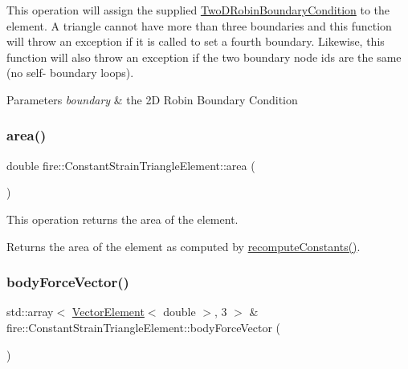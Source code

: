 This operation will assign the supplied \hyperlink{a00805}{Two\+D\+Robin\+Boundary\+Condition} to the element. A triangle cannot have more than three boundaries and this function will throw an exception if it is called to set a fourth boundary. Likewise, this function will also throw an exception if the two boundary node ids are the same (no self-\/ boundary loops). 
\begin{DoxyParams}{Parameters}
{\em boundary} & the 2D Robin Boundary Condition \\
\hline
\end{DoxyParams}
\mbox{\label{a00789_acd197716c6bffaa3c7b472661f0e5ca4}} 
\subsubsection{\texorpdfstring{area()}{area()}}
{\footnotesize\ttfamily double fire\+::\+Constant\+Strain\+Triangle\+Element\+::area (\begin{DoxyParamCaption}{ }\end{DoxyParamCaption})}

This operation returns the area of the element. \begin{DoxyReturn}{Returns}
the area of the element as computed by \hyperlink{a00789_a40cf9432221b62db76e8b154e3e81e3d}{recompute\+Constants()}. 
\end{DoxyReturn}
\mbox{\label{a00789_ae0795172aa1ee5ffc68ec0e2c4aab9cc}} 
\subsubsection{\texorpdfstring{body\+Force\+Vector()}{bodyForceVector()}}
{\footnotesize\ttfamily std\+::array$<$ \hyperlink{a00210_a08f01d4bb892cf7b2386d0f3a8643d72}{Vector\+Element}$<$ double $>$, 3 $>$ \& fire\+::\+Constant\+Strain\+Triangle\+Element\+::body\+Force\+Vector (\begin{DoxyParamCaption}{ }\end{DoxyParamCaption})}

